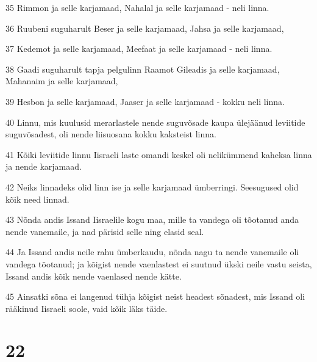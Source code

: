 \par 35 Rimmon ja selle karjamaad, Nahalal ja selle karjamaad - neli linna.
\par 36 Ruubeni suguharult Beser ja selle karjamaad, Jahsa ja selle karjamaad,
\par 37 Kedemot ja selle karjamaad, Meefaat ja selle karjamaad - neli linna.
\par 38 Gaadi suguharult tapja pelgulinn Raamot Gileadis ja selle karjamaad, Mahanaim ja selle karjamaad,
\par 39 Hesbon ja selle karjamaad, Jaaser ja selle karjamaad - kokku neli linna.
\par 40 Linnu, mis kuulusid merarlastele nende suguvõsade kaupa ülejäänud leviitide suguvõsadest, oli nende liisuosana kokku kaksteist linna.
\par 41 Kõiki leviitide linnu Iisraeli laste omandi keskel oli nelikümmend kaheksa linna ja nende karjamaad.
\par 42 Neiks linnadeks olid linn ise ja selle karjamaad ümberringi. Seesugused olid kõik need linnad.
\par 43 Nõnda andis Issand Iisraelile kogu maa, mille ta vandega oli tõotanud anda nende vanemaile, ja nad pärisid selle ning elasid seal.
\par 44 Ja Issand andis neile rahu ümberkaudu, nõnda nagu ta nende vanemaile oli vandega tõotanud; ja kõigist nende vaenlastest ei suutnud ükski neile vastu seista, Issand andis kõik nende vaenlased nende kätte.
\par 45 Ainsatki sõna ei langenud tühja kõigist neist headest sõnadest, mis Issand oli rääkinud Iisraeli soole, vaid kõik läks täide.

\chapter{22}

